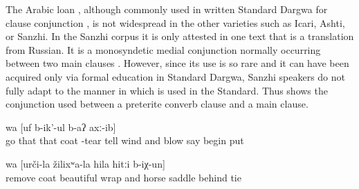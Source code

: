 The Arabic loan , although commonly used in written Standard Dargwa for clause conjunction \citep{vandenBerg2004}, is not widespread in the other varieties such as Icari, Ashti, or Sanzhi. In the Sanzhi corpus it is only attested in one text that is a translation from Russian. It is a monosyndetic medial conjunction normally occurring between two main clauses . However, since its use is so rare and it can have been acquired only via formal education in Standard Dargwa, Sanzhi speakers do not fully adapt to the manner in which  is used in the Standard. Thus  shows the conjunction used between a preterite converb clause and a main clause.
%
\begin{exe}
	\ex	\label{ex:‎I will blow at him, I will take his coat off, said the wind and began to blow}
	\gll	[``du	či-b-uq-un-ne	hel-i-j,	hel-i-la	walžaʁ	či-r-sa-jsː-an=da,''	b-urs-ib	č'an-ni]	wa	[uf	b-ik'-ul	b-aʔ	axː-ib]\\
			go	that	that	coat	-tear	tell	wind	and	blow	\tsc{n-}say	begin	put\\
	\glt	{}

	\ex	\label{ex:‎‎‎He took off his coat, put it together well, and tied it to his horse's saddle.}
		wa	[urči-la	žilixʷa-la	hila	hitːi	b-iχ-un]\\
		remove		coat	beautiful	wrap	and	horse\tsc{-gen}	saddle	behind		tie\\
	\glt	{}
\end{exe}

